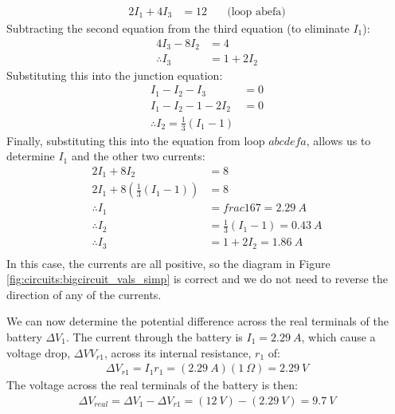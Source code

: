 \begin{example}
\begin{align*}
2I_1+4I_3&=12 \quad&\text{(loop abefa)}
\end{align*}
Subtracting the second equation from the third equation (to eliminate $I_1$):
\begin{align*}
4I_3-8I_2&=4\\
\therefore I_3&=1+2I_2
\end{align*}
Substituting this into the junction equation:
\begin{align*}
I_1-I_2-I_3&=0\\
I_1-I_2-1-2I_2&=0\\
\therefore I_2=\frac{1}{3}(I_1-1)
\end{align*}
Finally, substituting this into the equation from loop $abcdefa$, allows us to determine $I_1$ and the other two currents:
\begin{align*}
2I_1+8I_2&=8\\
2I_1+8\left(\frac{1}{3}(I_1-1) \right)&=8\\
\therefore I_1&=frac{16}{7}=\SI{2.29}{A}\\
\therefore I_2&=\frac{1}{3}(I_1-1)=\SI{0.43}{A}\\
\therefore I_3&=1+2I_2=\SI{1.86}{A}\\
\end{align*}
In this case, the currents are all positive, so the diagram in Figure \ref{fig:circuits:bigcircuit_vals_simp} is correct and we do not need to reverse the direction of any of the currents. 

We can now determine the potential difference across the real terminals of the battery $\Delta V_1$. The current through the battery is $I_1=\SI{2.29}{A}$, which cause a voltage drop, $\Delta VV_{r1}$, across its internal resistance, $r_1$ of:
\begin{align*}
\Delta V_{r1}=I_1r_1=(\SI{2.29}{A})(\SI{1}{\Omega})=\SI{2.29}{V}
\end{align*} 
The voltage across the real terminals of the battery is then:
\begin{align*}
\Delta V_{real}=\Delta V_1-\Delta V_{r1}=(\SI{12}{V})-(\SI{2.29}{V})=\SI{9.7}{V}
\end{align*}


\end{example}
